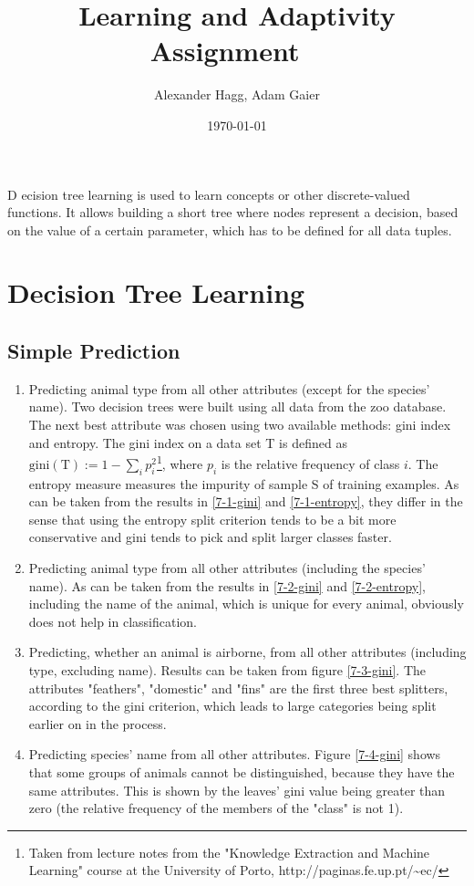 \documentclass[	DIV=calc,%
				paper=a4,%
				fontsize=11pt,%
				twocolumn]{scrartcl}	 %
\title{Learning and Adaptivity
\\ Assignment ~\upperRomannumeral{2}}%
\author{Alexander Hagg, Adam Gaier }	%
\date{\today}
\newcommand{\initial}[1]{%
     \lettrine[lines=3,lhang=0.3,nindent=0em]{
     				\color{brsublue}
     				{\textsf{#1}}}{}}
\begin{document}
\maketitle
\thispagestyle{fancy} %
\initial{D}\textbf{ } ecision tree learning is used to learn concepts or other discrete-valued functions. It allows building a short tree where nodes represent a decision, based on the value of a certain parameter, which has to be defined for all data tuples. 

\setcounter{section}{5}
\section{Decision Tree Learning}
\subsection{Simple Prediction}

\begin{enumerate}
	\item Predicting animal type from all other attributes (except for the species' name). Two decision trees were built using all data from the zoo database. The next best attribute was chosen using two available methods: gini index and entropy. The gini index on a data set T is defined as $\mathrm{gini(T)} := 1 - \sum_i p_i^2$\footnote{Taken from lecture notes from the "Knowledge Extraction and Machine Learning" course at the University of Porto, http://paginas.fe.up.pt/\textasciitilde ec/}, where $p_i$ is the relative frequency of class $i$. The entropy measure measures the impurity of sample S of training examples. 
	As can be taken from the results in \ref{7-1-gini} and \ref{7-1-entropy}, they differ in the sense that using the entropy split criterion tends to be a bit more conservative and gini tends to pick and split larger classes faster.
	
	\item Predicting animal type from all other attributes (including the species' name). As can be taken from the results in \ref{7-2-gini} and \ref{7-2-entropy}, including the name of the animal, which is unique for every animal, obviously does not help in classification.
	
	\item Predicting, whether an animal is airborne, from all other attributes (including type, excluding name). Results can be taken from figure \ref{7-3-gini}. The attributes "feathers", "domestic" and "fins" are the first three best splitters, according to the gini criterion, which leads to large categories being split earlier on in the process.
	
	\item Predicting species' name from all other attributes. Figure \ref{7-4-gini} shows that some groups of animals cannot be distinguished, because they have the same attributes. This is shown by the leaves' gini value being greater than zero (the relative frequency of the members of the "class" is not 1).
\end{enumerate}
\end{document}
